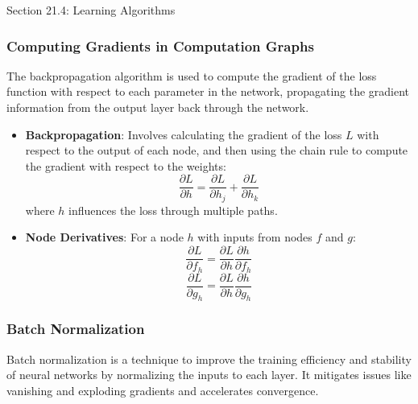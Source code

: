 \begin{notes}{Section 21.4: Learning Algorithms}
    \subsubsection*{Computing Gradients in Computation Graphs}
    
    The backpropagation algorithm is used to compute the gradient of the loss function with respect to each parameter in the network, propagating the gradient information from the output layer back through 
    the network.
    
    \begin{highlight}
    
        \begin{itemize}
            \item \textbf{Backpropagation}: Involves calculating the gradient of the loss $L$ with respect to the output of each node, and then using the chain rule to compute the gradient with respect 
            to the weights:
            \[
            \frac{\partial L}{\partial h} = \frac{\partial L}{\partial h_j} + \frac{\partial L}{\partial h_k}
            \]
            where $h$ influences the loss through multiple paths.
            \item \textbf{Node Derivatives}: For a node $h$ with inputs from nodes $f$ and $g$:
            \[
            \frac{\partial L}{\partial f_h} = \frac{\partial L}{\partial h} \frac{\partial h}{\partial f_h}
            \]
            \[
            \frac{\partial L}{\partial g_h} = \frac{\partial L}{\partial h} \frac{\partial h}{\partial g_h}
            \]
        \end{itemize}
    
    \end{highlight}
    
    \subsubsection*{Batch Normalization}
    
    Batch normalization is a technique to improve the training efficiency and stability of neural networks by normalizing the inputs to each layer. It mitigates issues like vanishing and exploding gradients 
    and accelerates convergence.
    
    \begin{highlight}
    

\end{highlight}
\end{notes}

